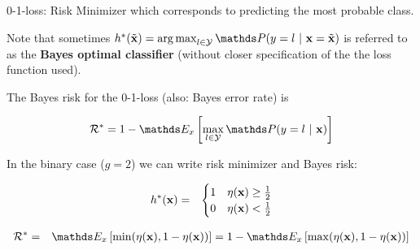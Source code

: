 \documentclass[11pt,compress,t,notes=noshow, xcolor=table]{beamer}
\begin{document}
\begin{vbframe}{0-1-loss: Risk Minimizer}
which corresponds to predicting the most probable class. 

\vspace*{0.2cm} 

Note that sometimes $h^{\ast}(\xtil) = \argmax_{l \in \Yspace} \P(y = l~|~ \xv = \xtil)$ is referred to as the \textbf{Bayes optimal classifier} (without closer specification of the the loss function used). 

\lz 

The Bayes risk for the 0-1-loss (also: Bayes error rate) is 

$$
  \riskbayes = 1 - \E_{x} \left[\max_{l \in \Yspace} \P(y = l~|~ \xv)\right]
$$

\lz 

In the binary case ($g = 2$) we can write risk minimizer and Bayes risk:  

\begin{eqnarray*}
  h^{\ast}(\mathbf{x}) &=& \begin{cases} 1 & \eta(\mathbf{x}) \ge \frac{1}{2} \\ 0 & \eta(\mathbf{x}) < \frac{1}{2}\end{cases} \\
\end{eqnarray*}

\vspace*{-0.7cm}

\begin{eqnarray*}
  \riskbayes &=& \E_x\left[\min(\eta(\xv), 1 - \eta(\xv))\right] = 1 - \E_x\left[\max(\eta(\xv), 1 - \eta(\xv))\right] 
\end{eqnarray*}












\end{vbframe}
\end{document}
